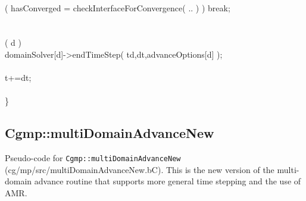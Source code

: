 \begin{flushleft}
\ic      \END \\
\ic      \IF( hasConverged = checkInterfaceForConvergence( .. ) ) break; \\
\ib  \END \\
\ib \\
\ib   \ForDomain( d ) \\
\ic      domainSolver[d]->endTimeStep( td,dt,advanceOptions[d] ); \\
\ib   \END \\
\ib   t+=dt;  \\
\ia \END \\
\}
\end{flushleft}

\clearpage
\subsection{Cgmp::multiDomainAdvanceNew}\label{sec:Cgmp::multiDomainAdvanceNew}

Pseudo-code for {\tt Cgmp::multiDomainAdvanceNew} (cg/mp/src/multiDomainAdvanceNew.bC). This is 
the new version of the multi-domain advance routine that supports more general time stepping and
the use of AMR.


